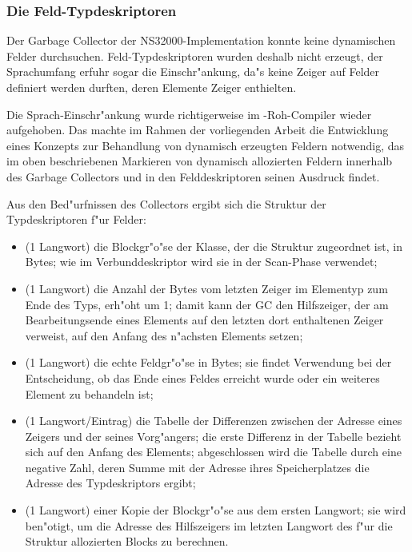 \subsubsection{Die Feld-Typdeskriptoren}
\label{Feld-Typdeskriptoren}

Der Garbage Collector der NS32000-Implementation konnte keine dynamischen
Felder durchsuchen.
Feld-Typdeskriptoren wurden deshalb nicht erzeugt, der Sprachumfang
erfuhr sogar die Einschr"ankung, da"s keine Zeiger auf Felder definiert
werden durften, deren Elemente Zeiger enthielten.

Die Sprach-Einschr"ankung wurde richtigerweise im \OP-Roh-Compiler wieder
aufgehoben.
Das machte im Rahmen der vorliegenden Arbeit die Entwicklung eines
Konzepts zur Behandlung von dynamisch erzeugten Feldern notwendig,
das im oben beschriebenen Markieren von dynamisch allozierten Feldern
innerhalb des Garbage Collectors und in den Felddeskriptoren seinen Ausdruck
findet.

Aus den Bed"urfnissen des Collectors ergibt sich die Struktur der
Typdeskriptoren f"ur Felder:
\begin{itemize}
\item (1 Langwort) die Blockgr"o"se der Klasse, der die Struktur zugeordnet
  ist, in Bytes; wie im Verbunddeskriptor wird sie in der Scan-Phase verwendet;
\item (1 Langwort) die Anzahl der Bytes vom letzten Zeiger im Elementyp
  zum Ende des Typs, erh"oht um 1;
  damit kann der GC den Hilfszeiger, der am Bearbeitungsende eines Elements
  auf den letzten dort enthaltenen Zeiger verweist, auf den Anfang des n"achsten
  Elements setzen;
\item (1 Langwort) die echte Feldgr"o"se in Bytes; sie findet Verwendung
  bei der Entscheidung, ob das Ende eines Feldes erreicht wurde oder ein
  weiteres Element zu behandeln ist;
\item (1 Langwort/Eintrag) die Tabelle der Differenzen zwischen der Adresse
  eines Zeigers und der seines Vorg"angers; die erste Differenz in der
  Tabelle bezieht sich auf den Anfang des Elements;
  abgeschlossen wird die Tabelle durch eine negative Zahl, deren Summe mit
  der Adresse ihres Speicherplatzes die Adresse des Typdeskriptors ergibt;
\item (1 Langwort) einer Kopie der Blockgr"o"se aus dem ersten Langwort;
  sie wird ben"otigt, um die Adresse des Hilfszeigers im letzten Langwort
  des f"ur die Struktur allozierten Blocks zu berechnen.
\end{itemize}


